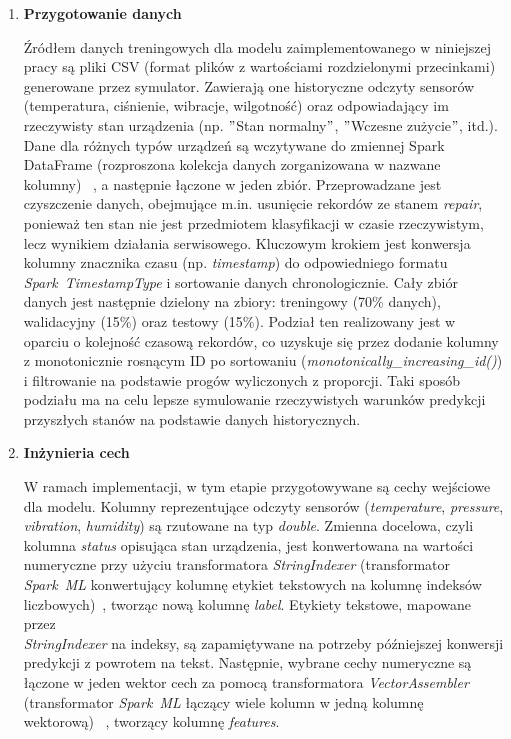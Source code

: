 \vspace{0.3em}

\begin{enumerate}
    \setlength\itemsep{0.5em}

    \item \textbf{Przygotowanie danych}

Źródłem danych treningowych dla modelu zaimplementowanego w niniejszej pracy są pliki CSV (format plików z wartościami rozdzielonymi przecinkami)~\cite{csv_rfc} generowane przez symulator. Zawierają one historyczne odczyty sensorów (temperatura, ciśnienie, wibracje, wilgotność) oraz odpowiadający im rzeczywisty stan urządzenia (np. \("\)Stan normalny\("\), \("\)Wczesne zużycie\("\), itd.). Dane dla różnych typów urządzeń są wczytywane do zmiennej Spark DataFrame (rozproszona kolekcja danych zorganizowana w nazwane kolumny)~\cite{chambers2018spark} , a następnie łączone w jeden zbiór. Przeprowadzane jest czyszczenie danych, obejmujące m.in. usunięcie rekordów ze stanem \textit{repair}, ponieważ ten stan nie jest przedmiotem klasyfikacji w czasie rzeczywistym, lecz wynikiem działania serwisowego. Kluczowym krokiem jest konwersja kolumny znacznika czasu (np. \textit{timestamp}) do odpowiedniego formatu \mbox{\textit{Spark TimestampType}} i sortowanie danych chronologicznie. Cały zbiór danych jest następnie dzielony na zbiory: treningowy (70\% danych), walidacyjny (15\%) oraz testowy (15\%). Podział ten realizowany jest w oparciu o kolejność czasową rekordów, co uzyskuje się przez dodanie kolumny z monotonicznie rosnącym ID po sortowaniu (\textit{monotonically\_increasing\_id()}) i filtrowanie na podstawie progów wyliczonych z proporcji. Taki sposób podziału ma na celu lepsze symulowanie rzeczywistych warunków predykcji przyszłych stanów na podstawie danych historycznych.

 \item \textbf{Inżynieria cech}

W ramach implementacji, w tym etapie przygotowywane są cechy wejściowe dla modelu. Kolumny reprezentujące odczyty sensorów (\textit{temperature}, \textit{pressure}, \textit{vibration}, \textit{humidity}) są rzutowane na typ \textit{double}. Zmienna docelowa, czyli kolumna \textit{status} opisująca stan urządzenia, jest konwertowana na wartości numeryczne przy użyciu transformatora \textit{StringIndexer} (transformator \mbox{\textit{Spark ML}} konwertujący kolumnę etykiet tekstowych na kolumnę indeksów liczbowych)~\cite{spark_mllib_reference}, tworząc nową kolumnę \textit{label}. Etykiety tekstowe, mapowane przez \\ \textit{StringIndexer} na indeksy, są zapamiętywane na potrzeby późniejszej konwersji predykcji z powrotem na tekst. Następnie, wybrane cechy numeryczne są łączone w jeden wektor cech za pomocą transformatora \textit{VectorAssembler} (transformator \mbox{\textit{Spark ML}} łączący wiele kolumn w jedną kolumnę wektorową)~\cite{spark_mllib_reference} , tworzący kolumnę \textit{features}.


\end{enumerate}
